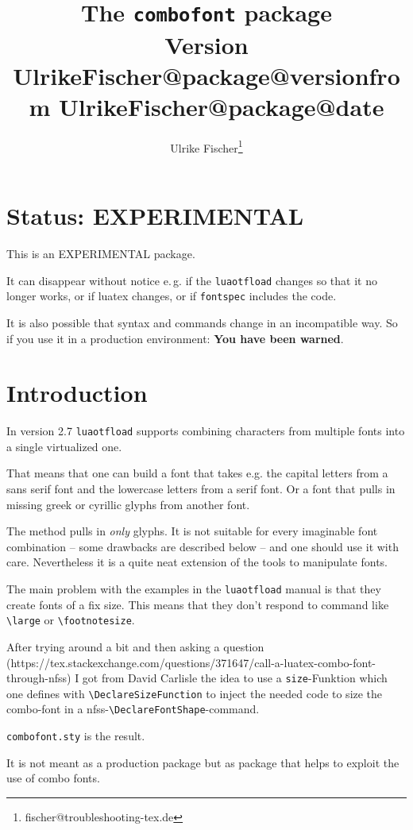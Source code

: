 \documentclass[parskip=half-,egregdoesnotlikesansseriftitles]{scrartcl}
\title{The \texttt{combofont} package \\ Version \csname UlrikeFischer@package@version\endcsname from \csname UlrikeFischer@package@date\endcsname}
\author{Ulrike Fischer\thanks{fischer@troubleshooting-tex.de}}
\newcommand\package[1]{\texttt{#1}}
\begin{document}
\maketitle

\section{Status: EXPERIMENTAL}

This is an EXPERIMENTAL package.

It can disappear without notice e.\,g. if the \package{luaotfload} changes so that it no longer works, or if luatex changes, or if \package{fontspec} includes the code.

It is also possible that syntax and commands change in an incompatible way. So if you use it in a production environment: \textbf{You have been warned}.

\section{Introduction}
In version 2.7 \package{luaotfload} supports combining characters from multiple fonts into a single virtualized one.

That means that one can build a font that takes e.g. the capital letters from a sans serif font and the lowercase letters from a serif font. Or a font that pulls in missing greek or cyrillic glyphs from another font.

The method pulls in \emph{only} glyphs. It is not suitable for every imaginable font combination -- some drawbacks are described below -- and one should use it with care. Nevertheless it is a quite neat extension of the tools to manipulate fonts.

The main problem with the examples in the \package{luaotfload} manual is that they create fonts of a fix size. This means that they don't respond to command like \verb+\large+ or \verb+\footnotesize+.

After trying around a bit and then asking a question (https://tex.stackexchange.com/questions/371647/call-a-luatex-combo-font-through-nfss) I got from David Carlisle the idea to use a \texttt{size}-Funktion which one defines with \verb+\DeclareSizeFunction+ to inject the needed code to size the combo-font in a nfss-\verb+\DeclareFontShape+-command.

\package{combofont.sty} is the result.

It is not meant as a production package but as package that helps to exploit the use of combo fonts.
\end{document}
